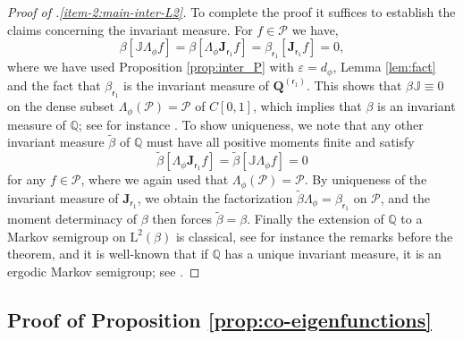 \documentclass[JEP,XML,SOM,Unicode]{cedram}
\let\epsilon\varepsilon
\theoremstyle{plain}
\theoremstyle{definition}
\newcommand{\Poly}{\mathscr{P}}
\newcommand{\J}{\mathds{Q}}
\newcommand{\calJ}{\mathds{J}}
\newcommand{\Leb}{\mathrm{L}}
\newcommand{\calJd}{\mathbf{J}}
\newcommand{\lam}{{\bm{\lambda}_1}}
\newcommand{\vat}{{\mathsf{r}_1}}
\newcommand{\Q}[1][\mo]{\mathbf{Q}^{({#1})}}
\newcommand{\gab}[1][\lam,\mo]{{\beta_{#1}}}
\let\mo\mu
\let\bpsi\beta
\begin{document}
\begin{proof}[Proof of .\eqref{item-2:main-inter-L2}]

To complete the proof it suffices to establish the claims concerning the invariant measure. For $f \in \Poly$ we have,
\[
\bpsi[\calJ \Lambda_{\phi}f] = \bpsi[\Lambda_{\phi}\calJd_{\vat} f] =\gab[\vat] [\calJd_{\vat} f] = 0,
\]
where we have used Proposition \ref{prop:inter_P} with $\epsilon = d_\phi$, Lemma \ref{lem:fact} and the fact that $\gab[\vat]$ is the invariant measure of $\Q[\vat]$. This shows that $\bpsi \calJ \equiv 0$ on the dense subset $\Lambda_{\phi}(\Poly)=\Poly$ of $C[0,1]$, which implies that $\bpsi$ is an invariant measure of $\J$; see for instance \cite[\S 1.4.1]{Bakry_Book}. To show uniqueness, we note that any other invariant measure $\widetilde{\bpsi}$ of $\J$ must have all positive moments finite and satisfy
\begin{equation*}
\widetilde{\bpsi} [ \Lambda_{\phi} \calJd_{\vat} f ] =\widetilde{\bpsi} [ \calJ \Lambda_\phi f ] = 0
\end{equation*}
for any $f \in \Poly$, where we again used that $\Lambda_\phi(\Poly) = \Poly$. By uniqueness of the invariant measure of $\calJd_{\vat}$, we obtain the factorization $\widetilde{\bpsi} \Lambda_{\phi} = \gab[\vat]$ on $\Poly$, and the moment determinacy of $\bpsi$ then forces $\widetilde{\bpsi} = \bpsi$. Finally the extension of $\J$ to a Markov semigroup on $\Leb^2(\bpsi)$ is classical, see for instance the remarks before the theorem, and it is well-known that if $\J$ has a unique invariant measure, it is an ergodic Markov semigroup; see \eg \cite[Th.\,5.16]{da-prato:2006}.
\end{proof}

\subsection{Proof of Proposition \ref{prop:co-eigenfunctions}}
\end{document}
